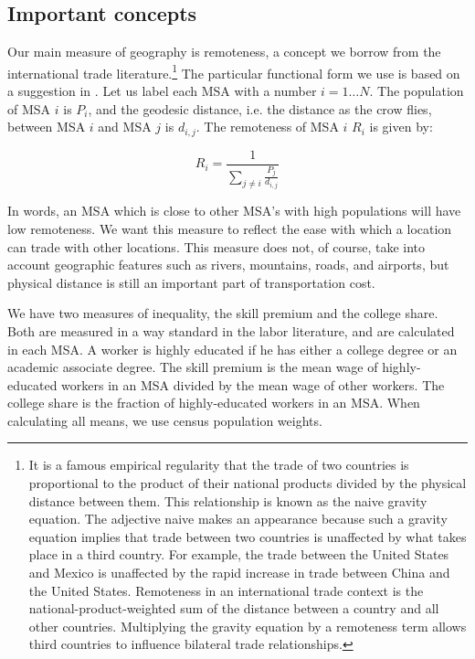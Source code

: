 \documentclass{article}
\begin{document}
\subsection{Important concepts}

Our main measure of geography is remoteness, a concept we borrow from the international trade literature.\footnote{It is a famous empirical regularity that the trade of two countries is proportional to the product of their national products divided by the physical distance between them.  This relationship is known as the naive gravity equation.  The adjective naive makes an appearance because such a gravity equation implies that trade between two countries is unaffected by what takes place in a third country.  For example, the trade between the United States and Mexico is unaffected by the rapid increase in trade between China and the United States.  Remoteness in an international trade context is the national-product-weighted sum of the distance between a country and all other countries.  Multiplying the gravity equation by a remoteness term allows third countries to influence bilateral trade relationships.}  The particular functional form we use is based on a suggestion in \citet{head2003gravity}.  Let us label each MSA with a number $i=1\dots N$.  The population of MSA $i$ is $P_i$, and the geodesic distance, i.e. the distance as the crow flies, between MSA $i$ and MSA $j$ is $d_{i,j}$.  The remoteness of MSA $i$ $R_i$ is given by:

\begin{equation}
    R_i = \frac{1}{\sum_{j\neq i} \frac{P_j}{d_{i,j}}} \nonumber
    \label{eq:rem}
\end{equation}

In words, an MSA which is close to other MSA's with high populations will have low remoteness.  We want this measure to reflect the ease with which a location can trade with other locations.  This measure does not, of course, take into account geographic features such as rivers, mountains, roads, and airports, but physical distance is still an important part of transportation cost.  

We have two measures of inequality, the skill premium and the college share.  Both are measured in a way standard in the labor literature, and are calculated in each MSA.  A worker is highly educated if he has either a college degree or an academic associate degree.  The skill premium is the mean wage of highly-educated workers in an MSA divided by the mean wage of other workers.  The college share is the fraction of highly-educated workers in an MSA.  When calculating all means, we use census population weights.
\end{document}
